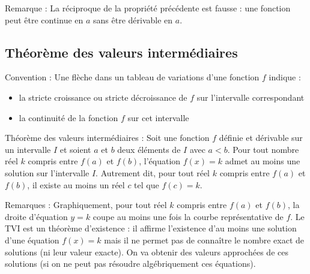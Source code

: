 \documentclass[11pt,a4paper]{article}
\begin{document}
\begin{boiteRemarque}{Remarque :}
    La réciproque de la propriété précédente est fausse : une fonction peut être continue en $a$ sans être dérivable en $a$. 
\end{boiteRemarque}

\subsection{Théorème des valeurs intermédiaires}

\begin{boiteRappel}{Convention :}
    Une flèche dans un tableau de variations d'une fonction $f$ indique :
    \begin{itemize}
        \item la stricte croissance ou stricte décroissance de $f$ sur l'intervalle correspondant
        \item la continuité de la fonction $f$ sur cet intervalle
    \end{itemize}    
\end{boiteRappel}

\begin{boiteProp}{Théorème des valeurs intermédiaires :}
    Soit une fonction $f$ définie et dérivable sur un intervalle $I$ et soient $a$ et $b$ deux éléments de $I$ avec $a < b$.
    \newline
    Pour tout nombre réel $k$ compris entre $f(a)$ et $f(b)$, l'équation $f(x) = k$ admet au moins une solution sur l'intervalle $I$.
    \newline
    Autrement dit, pour tout réel $k$ compris entre $f(a)$ et $f(b)$, il existe au moins un réel $c$ tel que $f(c) = k$.
\end{boiteProp}

\begin{boiteRemarque}{Remarques :}
    Graphiquement, pour tout réel $k$ compris entre $f(a)$ et $f(b)$, la droite d'équation $y = k$ coupe au moins une fois la courbe représentative de $f$.
    \newline
    Le TVI est un théorème d'existence : il affirme l'existence d'au moins une solution d'une équation $f(x) = k$ mais il ne permet pas de connaître le nombre exact de solutions (ni leur valeur exacte).
    \newline
    On va obtenir des valeurs approchées de ces solutions (si on ne peut pas résoudre algébriquement ces équations).
\end{boiteRemarque}
\end{document}
